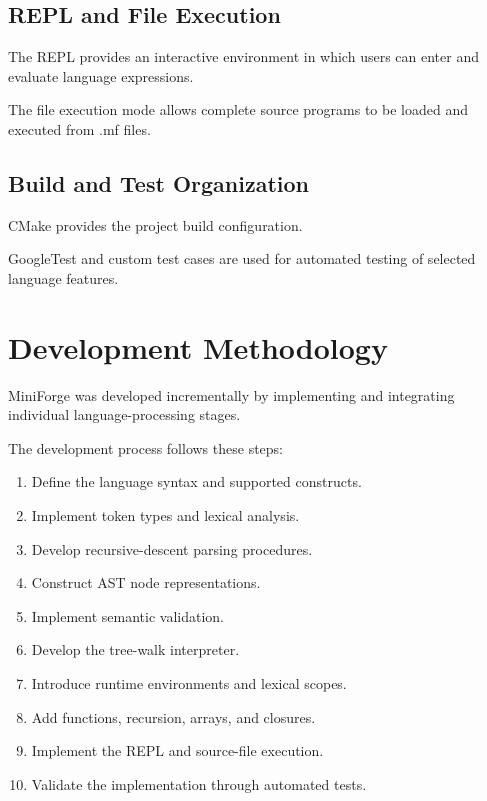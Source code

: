 \documentclass[conference]{IEEEtran}
\begin{document}
\subsection{REPL and File Execution}

The REPL provides an interactive environment in
which users can enter and evaluate language
expressions.

The file execution mode allows complete source
programs to be loaded and executed from .mf files.

\subsection{Build and Test Organization}

CMake provides the project build configuration.

GoogleTest and custom test cases are used for
automated testing of selected language features.

\section{Development Methodology}

MiniForge was developed incrementally by implementing
and integrating individual language-processing stages.

The development process follows these steps:

\begin{enumerate}
    \item Define the language syntax and supported constructs.
    \item Implement token types and lexical analysis.
    \item Develop recursive-descent parsing procedures.
    \item Construct AST node representations.
    \item Implement semantic validation.
    \item Develop the tree-walk interpreter.
    \item Introduce runtime environments and lexical scopes.
    \item Add functions, recursion, arrays, and closures.
    \item Implement the REPL and source-file execution.
    \item Validate the implementation through automated tests.
\end{enumerate}
\end{document}
